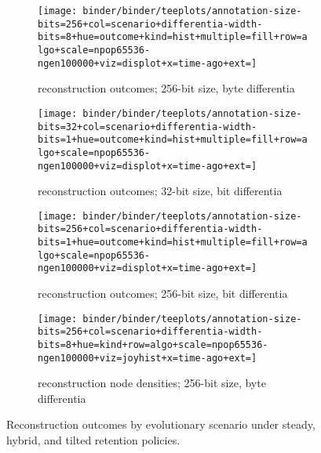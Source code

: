 \begin{figure*}
  \centering

\begin{subfigure}[b]{0.4\textwidth}
\centering
\texttt{[image: binder/binder/teeplots/annotation-size-bits=256+col=scenario+differentia-width-bits=8+hue=outcome+kind=hist+multiple=fill+row=algo+scale=npop65536-ngen100000+viz=displot+x=time-ago+ext=]}
\caption{reconstruction outcomes; 256-bit size, byte differentia}
\end{subfigure}%
\begin{subfigure}[b]{0.6\textwidth}
\centering
\texttt{[image: binder/binder/teeplots/annotation-size-bits=32+col=scenario+differentia-width-bits=1+hue=outcome+kind=hist+multiple=fill+row=algo+scale=npop65536-ngen100000+viz=displot+x=time-ago+ext=]}
\caption{reconstruction outcomes; 32-bit size, bit differentia}
\end{subfigure}

\begin{subfigure}[b]{0.4\textwidth}
  \centering
  \texttt{[image: binder/binder/teeplots/annotation-size-bits=256+col=scenario+differentia-width-bits=1+hue=outcome+kind=hist+multiple=fill+row=algo+scale=npop65536-ngen100000+viz=displot+x=time-ago+ext=]}
  \caption{reconstruction outcomes; 256-bit size, bit differentia}
  \end{subfigure}%
  \begin{subfigure}[b]{0.6\textwidth}
    \flushright
    \texttt{[image: binder/binder/teeplots/annotation-size-bits=256+col=scenario+differentia-width-bits=8+hue=kind+row=algo+scale=npop65536-ngen100000+viz=joyhist+x=time-ago+ext=]}
    \caption{reconstruction node densities; 256-bit size, byte differentia}
  \end{subfigure}%
  \caption{Reconstruction outcomes by evolutionary scenario under steady, hybrid, and tilted retention policies.}
  \label{fig:recency-structure}

\end{figure*}

